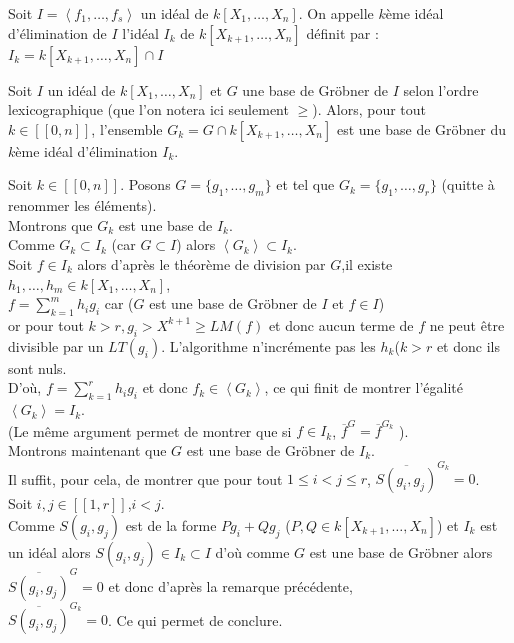 \begin{Def}Soit $I=\left\langle f_1,\ldots,f_s \right\rangle $ un idéal de $k[X_1,\ldots,X_n]$. On appelle $k$ème idéal d'élimination de $I$ l'idéal $I_k$ de $k[X_{k+1},\ldots,X_n]$ définit par : $I_k=k[X_{k+1},\ldots,X_n] \cap I$
\end{Def}
 

\begin{Thm}[ d'élimination ]

Soit $I $ un idéal de $k[X_1,\ldots,X_n]$ et $G$ une base de Gröbner de $I$ selon l'ordre lexicographique (que l'on notera ici seulement $\geq$). Alors, pour tout $k \in [\![0,n]\!]$, l'ensemble $G_k =G \cap k[X_{k+1},\ldots,X_n]  $ est une base de Gröbner du $k$ème idéal d'élimination $I_k$.
\end{Thm}

\begin{demo}

Soit $k \in [\![0,n]\!]$. Posons $G=\{g_1,\ldots,g_m\}$ et tel que $G_k=\{g_1,\ldots,g_r\}$ (quitte à renommer les éléments). \\
Montrons que $G_k$ est une base de $I_k$. \\
Comme $G_k \subset I_k$ (car $G \subset I$) alors $\left \langle G_k \right\rangle \subset I_k$.\\
Soit $f \in I_k$ alors d'après le théorème de division par $G$,il existe $h_1,\ldots,h_m \in k[X_1,\ldots,X_n]$,\\
$f=\sum_{k=1}^m h_ig_i$ car ($G$ est une base de Gröbner de $I$ et $f \in I$)\\
or pour tout $k>r, g_i > X^{k+1} \geq LM(f) $ et donc aucun terme de $f$ ne peut être divisible par un $LT(g_i)$. L'algorithme n'incrémente pas les $h_k$($k >r$ et donc ils sont nuls.  \\
D'où, $f=\sum_{k=1}^r h_ig_i$ et donc $f_k \in \left \langle G_k \right\rangle$, ce qui finit de montrer l'égalité $\left \langle G_k \right\rangle = I_k$.\\
(Le même argument permet de montrer que si $f \in I_k$, $\overline{f}^G=\overline{f}^{G_k}$ ).\\
Montrons maintenant que $G$ est une base de Gröbner de $I_k$.\\
Il suffit, pour cela, de montrer que pour tout $1 \leq i < j \leq r$, $\overline{S(g_i,g_j)}^{G_k}=0$.\\
Soit $i,j \in [\![1,r]\!]$,$ i<j$.\\
Comme $S(g_i,g_j)$ est de la forme $Pg_i+Qg_j$ ($P,Q \in k[X_{k+1},\ldots,X_n]$) et $I_k$ est un idéal alors $S(g_i,g_j) \in I_k \subset I$ d'où comme $G$ est une base de Gröbner alors $\overline{S(g_i,g_j)}^{G}=0$ et donc d'après la remarque précédente, \\
$\overline{S(g_i,g_j)}^{G_k}=0$. Ce qui permet de conclure.
\end{demo}
 

